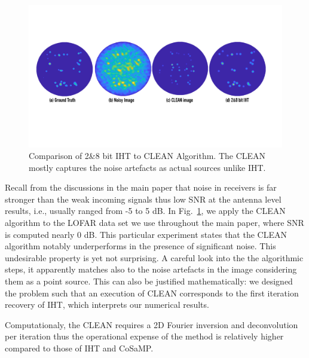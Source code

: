 \documentclass{article}
\begin{document}
\begin{figure}[t!]
\centering
\includegraphics[width=1\columnwidth, angle=0]{figs/clean_image.pdf}
\caption{Comparison of 2\&8 bit IHT to CLEAN Algorithm. The CLEAN mostly captures the noise artefacts as actual sources unlike IHT.}
\label{fig:clean}
\end{figure}
Recall from the discussions in the main paper that noise in receivers is far stronger than the weak incoming signals thus low SNR at the antenna level results, i.e., usually ranged from -5 to 5 dB. In Fig.~\ref{fig:clean}, we apply the CLEAN algorithm to the LOFAR data set we use throughout the main paper, where SNR is computed nearly 0 dB. This particular experiment states that the CLEAN algorithm notably underperforms in the presence of significant noise. This undesirable property is yet not surprising. A careful look into the the algorithmic steps, it apparently matches also to the noise artefacts in the image considering them as a point source. This can also be justified mathematically: we designed the problem such that an execution of {CLEAN} corresponds to the first iteration recovery of IHT, which interprets our numerical results. 

Computationaly, the CLEAN requires a 2D Fourier inversion and deconvolution per iteration thus the operational expense of the method is relatively higher compared to those of IHT and CoSaMP. 

% 
% 


\end{document}
